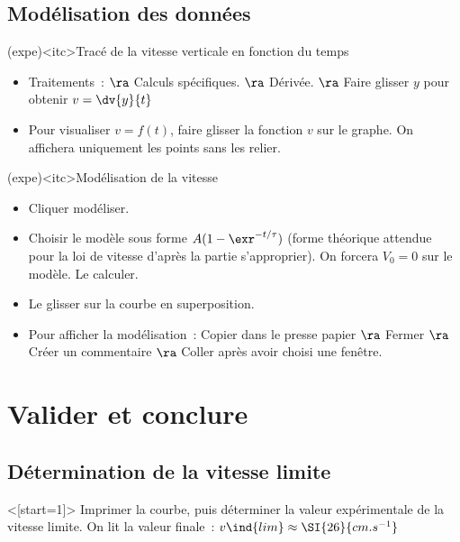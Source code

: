 \documentclass[../main/main.tex]{subfiles}
\begin{document}
{	\subsection{Modélisation des données}

	\begin{tcb}(expe)<itc>{Tracé de la vitesse verticale en fonction du temps}
		\begin{itemize}
			\item Traitements~: $\ra$ Calculs spécifiques. $\ra$ Dérivée. $\ra$ Faire
			      glisser $y$ pour obtenir $v = \dv{y}{t}$
			\item Pour visualiser $v = f(t)$, faire glisser la fonction $v$ sur le
			      graphe. On affichera uniquement les points sans les relier.
		\end{itemize}
	\end{tcb}

	\begin{tcb}[breakable](expe)<itc>{Modélisation de la vitesse}
		\begin{itemize}
			\item Cliquer modéliser.
			\item Choisir le modèle sous forme $A(1-\exr^{-t/\tau})$ (forme théorique
			      attendue pour la loi de vitesse d'après la partie s'approprier). On
			      forcera $V_0 = 0$ sur le modèle. Le calculer.
			\item Le glisser sur la courbe en superposition.
			\item Pour afficher la modélisation~: Copier dans le presse papier $\ra$
			      Fermer $\ra$ Créer un commentaire $\ra$ Coller après avoir choisi une
			      fenêtre.
		\end{itemize}
	\end{tcb}
}

\setcounter{section}{4}
\section{Valider et conclure}

\subsection{Détermination de la vitesse limite}

\QR<[start=1]>{%
	Imprimer la courbe, puis déterminer la valeur expérimentale de la vitesse
	limite.
}{%
	On lit la valeur finale~: $v\ind{lim} \approx \SI{26}{cm.s^{-1}}$
}
\end{document}
